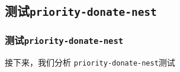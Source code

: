 \documentclass{beamer}
\begin{document}
\subsection{测试\texttt{priority-donate-nest}}

\begin{frame}
  \frametitle{测试\texttt{priority-donate-nest}}
  接下来，我们分析 \texttt{priority-donate-nest}测试

    
    
    
    
    
    
    
    
    
    
    
    

\end{frame}
\end{document}
